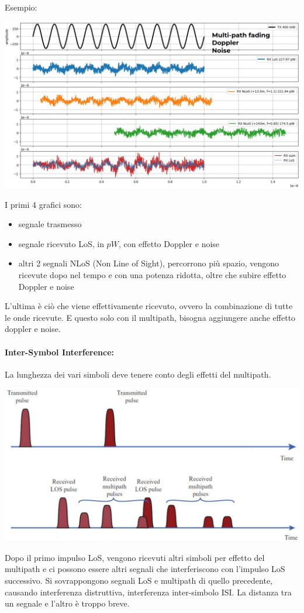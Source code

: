 Esempio:
\begin{center}
	\includegraphics[width=0.9\linewidth]{img/wireless/examplemultipath}
\end{center}
I primi 4 grafici sono:
\begin{itemize}
	\item segnale trasmesso
	\item segnale ricevuto LoS, in $pW$, con effetto Doppler e noise
	\item altri 2 segnali NLoS (Non Line of Sight), percorrono più spazio, vengono ricevute dopo nel tempo e con una potenza ridotta, oltre che subire effetto Doppler e noise
\end{itemize}
L'ultima è ciò che viene effettivamente ricevuto, ovvero la combinazione di tutte le onde ricevute. E questo solo con il multipath, bisogna aggiungere anche effetto doppler e noise. \\

\newpage

\paragraph{Inter-Symbol Interference:} La lunghezza dei vari simboli deve tenere conto degli effetti del multipath. 
\begin{center}
	\includegraphics[width=0.8\linewidth]{img/wireless/ISI1}
\end{center}
Dopo il primo impulso LoS, vengono ricevuti altri simboli per effetto del multipath e ci possono essere altri segnali che interferiscono con l'impulso LoS successivo. Si sovrappongono segnali LoS e multipath di quello precedente, causando interferenza distruttiva, interferenza inter-simbolo ISI. La distanza tra un segnale e l'altro è troppo breve.\\

